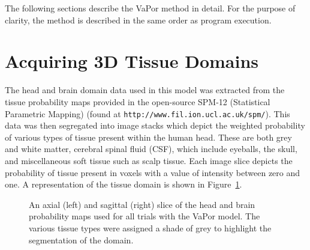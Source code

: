 \documentclass[11pt,english,a4paper,twoside,openright]{report}
\begin{document}
{{{{{{{{The following sections describe the VaPor method in detail. For the purpose of clarity, the method is described in the same order as program execution. 

\section[Acquiring 3D Tissue Domains]{{\Large A}cquiring {\Large 3D} {\Large T}issue {\Large D}omains}
\label{Sec:3Acquiring3dDomains}

The head and brain domain data used in this model was extracted from the tissue probability maps provided in the open-source SPM-12 (Statistical Parametric Mapping) \cite{penny2011statistical} (found at \texttt{http://www.fil.ion.ucl.ac.uk/spm/}). This data was then segregated into image stacks which depict the weighted probability of various types of tissue present within the human head. These are both grey and white matter, cerebral spinal fluid (CSF), which include eyeballs, the skull, and miscellaneous soft tissue such as scalp tissue. Each image slice depicts the probability of tissue present in voxels with a value of intensity between zero and one. A representation of the tissue domain is shown in Figure~\ref{fig:TissueDomains}.

\begin{figure}[h]
	\centering
	
	
	\caption[Slices of head and brain probability maps used for all trials in the VaPor model]{An axial (left) and sagittal (right) slice of the head and brain probability maps used for all trials with the VaPor model. The various tissue types were assigned a shade of grey to highlight the segmentation of the domain.}
	\label{fig:TissueDomains}
\end{figure}

}}}}}}}}
\end{document}

